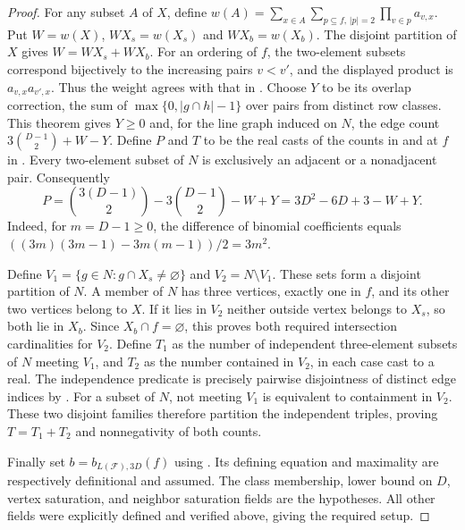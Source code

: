 \begin{proof}
For any subset $A$ of $X$, define
$w(A)=\sum_{x\in A}\sum_{p\subseteq f,\,|p|=2}\prod_{v\in p}a_{v,x}$.
Put $W=w(X)$, $WX_s=w(X_s)$ and $WX_b=w(X_b)$.
The disjoint partition of $X$ gives $W=WX_s+WX_b$.
For an ordering of $f$, the two-element subsets correspond bijectively to
the increasing pairs $v<v'$, and the displayed product is
$a_{v,x}a_{v',x}$. Thus the weight agrees with that in
. Choose $Y$ to be its overlap
correction, the sum of $\max\{0,|g\cap h|-1\}$ over pairs from distinct
row classes. This theorem gives $Y\ge0$ and, for the line graph induced
on $N$, the edge count $3\binom{D-1}{2}+W-Y$.
Define $P$ and $T$ to be the real casts of the counts in
 and 
at $f$ in . Every two-element subset of
$N$ is exclusively an adjacent or a nonadjacent pair. Consequently
\[
P=\binom{3(D-1)}2-3\binom{D-1}2-W+Y
 =3D^2-6D+3-W+Y.
\]
Indeed, for $m=D-1\ge0$, the difference of binomial coefficients equals
$((3m)(3m-1)-3m(m-1))/2=3m^2$.

Define $V_1=\{g\in N:g\cap X_s\ne\varnothing\}$ and $V_2=N\setminus V_1$.
These sets form a disjoint partition of $N$. A member of $N$ has three
vertices, exactly one in $f$, and its other two vertices belong to $X$.
If it lies in $V_2$ neither outside vertex belongs to $X_s$, so both lie
in $X_b$. Since $X_b\cap f=\varnothing$, this proves both required
intersection cardinalities for $V_2$.
Define $T_1$ as the number of independent three-element subsets of $N$
meeting $V_1$, and $T_2$ as the number contained in $V_2$, in each case
cast to a real. The independence predicate is precisely pairwise disjointness
of distinct edge indices by .
For a subset of $N$, not meeting $V_1$ is equivalent to containment in
$V_2$. These two disjoint families therefore partition the independent
triples, proving $T=T_1+T_2$ and nonnegativity of both counts.

Finally set $b=b_{L(\mathcal F),3D}(f)$ using .
Its defining equation and maximality are respectively definitional and
assumed. The class membership, lower bound on $D$, vertex saturation,
and neighbor saturation fields are the hypotheses. All other fields
were explicitly defined and verified above, giving the required setup.
\end{proof}
